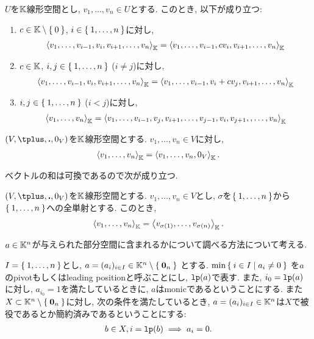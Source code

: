 \begin{lemma}
  $U$を$\mathbb{K}$線形空間とし,
  $v_1,\ldots,v_n\in U$とする.
  このとき, 以下が成り立つ:
  \begin{enumerate}
  \item
    $c\in \mathbb{K}\setminus\Set{0}$, $i\in\Set{1,\ldots,n}$に対し,
    \begin{align*}
      \Braket{v_1,\ldots,v_{i-1},v_{i},v_{i+1},\ldots,v_n}_{\mathbb{K}}=
      \Braket{v_1,\ldots,v_{i-1},cv_{i},v_{i+1},\ldots,v_n}_{\mathbb{K}}
    \end{align*}
  \item
    $c\in \mathbb{K}$, $i,j\in\Set{1,\ldots,n}$ ($i\neq j$)に対し,
    \begin{align*}
      \Braket{v_1,\ldots,v_{i-1},v_{i},v_{i+1},\ldots,v_n}_{\mathbb{K}}=
      \Braket{v_1,\ldots,v_{i-1},v_i+cv_{j},v_{i+1},\ldots,v_n}_{\mathbb{K}}
    \end{align*}
  \item
    $i,j\in\Set{1,\ldots,n}$ ($i< j$)に対し,
    \begin{align*}
      \Braket{v_1,\ldots,v_n}_{\mathbb{K}}=
      \Braket{v_1,\ldots,v_{i-1},v_j,v_{i+1},\ldots,v_{j-1},v_i,v_{j+1},,\ldots,v_n}_{\mathbb{K}}
    \end{align*}
  \end{enumerate}
\end{lemma}

\begin{lemma}
  $(V,\plus,\act,0_V)$を$\mathbb{K}$線形空間とする.
  $v_1,\ldots,v_n\in V$に対し,
    \begin{align*}
      \Braket{v_1,\ldots,v_n}_{\mathbb{K}}=
      \Braket{v_1,\ldots,v_n,0_V}_{\mathbb{K}}.
    \end{align*}
\end{lemma}

ベクトルの和は可換であるので次が成り立つ.
\begin{lemma}
  $(V,\plus,\act,0_V)$を$\mathbb{K}$線形空間とする.
  $v_1,\ldots,v_n\in V$とし,
  $\sigma$を$\Set{1,\ldots,n}$から$\Set{1,\ldots,n}$への全単射とする.
  このとき,
    \begin{align*}
      \Braket{v_1,\ldots,v_n}_{\mathbb{K}}=
      \Braket{v_{\sigma(1)},\ldots,v_{\sigma(n)}}_{\mathbb{K}}.
    \end{align*}
\end{lemma}


$a\in\mathbb{K}^n$が与えられた部分空間に含まれるかについて調べる方法について考える.

$I=\Set{1,\ldots,n}$とし,
$a=(a_i)_{i\in I}\in \mathbb{K}^n\setminus\Set{\boldsymbol{0}_n}$
とする.
$\min\Set{i\in I |a_i\neq 0}$
を$a$のpivotもしくはleading positionと呼ぶことにし,
$\operatorname{\texttt{lp}}(a)$で表す.
また,
$i_0=\operatorname{\texttt{lp}}(a)$に対し,
$a_{i_0}=1$を満たしているときに,
$a$はmonicであるということにする.
また$X\subset \mathbb{K}^n\setminus\Set{\boldsymbol{0}_n}$に対し,
次の条件を満たしているとき, $a=(a_i)_{i\in I}\in\mathbb{K}^n$は$X$で被役であるとか簡約済みであるということにする:
\begin{align*}
  b\in X, i=\operatorname{\texttt{lp}}(b) \implies
  a_{i}=0.
\end{align*}


